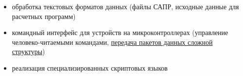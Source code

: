 
\begin{itemize}
\item обработка текстовых форматов данных
(файлы САПР, исходные данные для расчетных программ)
\item командный интерфейс для устройств на микроконтроллерах
(управление человеко-читаемыми командами, \underline{передача пакетов данных
сложной структуры})
\item реализация специализированных скриптовых языков
\end{itemize}